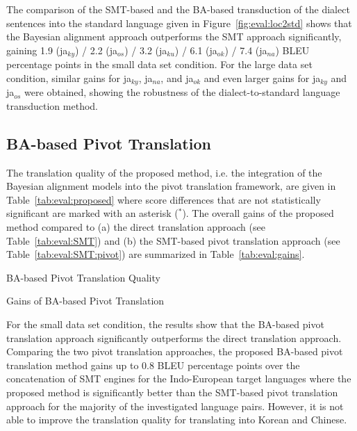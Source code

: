 \documentclass[english]{jnlp_1.4}
\begin{document}
The comparison of the SMT-based and the BA-based transduction of the dialect sentences into the standard language given in Figure~\ref{fig:eval:loc2std} shows
that the Bayesian alignment approach outperforms the SMT approach significantly,
gaining 1.9 (ja$_{ky}$) / 2.2 (ja$_{os}$) / 3.2 (ja$_{ku}$) / 6.1 (ja$_{ok}$) / 7.4 (ja$_{na}$) BLEU percentage points in the small data set condition.
For the large data set condition, similar gains for  ja$_{ky}$, ja$_{na}$, and ja$_{ok}$
and even larger gains for ja$_{ky}$ and ja$_{os}$ were obtained, showing the robustness of the dialect-to-standard language transduction method. 



\subsection{BA-based Pivot Translation}
\label{sec:experiments:pivot:ba}

The translation quality of the proposed method, i.e. the integration of the Bayesian alignment models into the pivot translation framework,
are given in Table~\ref{tab:eval:proposed} where score differences that are not statistically significant are marked with an asterisk (${}^{*}$).
The overall gains of the proposed method compared to (a) the direct translation approach (see Table~\ref{tab:eval:SMT}) and
(b) the SMT-based pivot translation approach (see Table~\ref{tab:eval:SMT:pivot}) are summarized in Table~\ref{tab:eval:gains}.

\begin{table}[b]
  \caption{BA-based Pivot Translation Quality}
  \label{tab:eval:proposed}

\end{table}

\begin{table}[t]
  \caption{Gains of BA-based Pivot Translation}
  \label{tab:eval:gains}

\end{table}

For the small data set condition, the results show that the BA-based pivot translation approach
significantly outperforms the direct translation approach.
Comparing the two pivot translation approaches, the proposed BA-based pivot translation method gains
up to 0.8 BLEU percentage points over the concatenation of SMT engines for the Indo-European target languages
where the proposed method is significantly better than the SMT-based pivot translation approach for the majority
of the investigated language pairs. However, it is not able to improve the translation quality for translating into Korean and Chinese.
\end{document}
